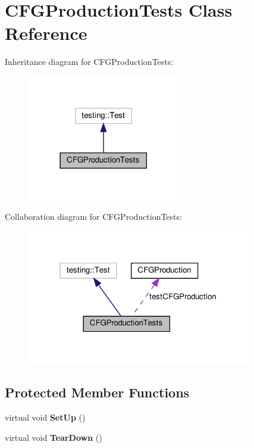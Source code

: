 \hypertarget{classCFGProductionTests}{}\section{C\+F\+G\+Production\+Tests Class Reference}
\label{classCFGProductionTests}


Inheritance diagram for C\+F\+G\+Production\+Tests\+:
\nopagebreak
\begin{figure}[H]
\begin{center}
\leavevmode
\includegraphics[width=189pt]{classCFGProductionTests__inherit__graph}
\end{center}
\end{figure}


Collaboration diagram for C\+F\+G\+Production\+Tests\+:
\nopagebreak
\begin{figure}[H]
\begin{center}
\leavevmode
\includegraphics[width=278pt]{classCFGProductionTests__coll__graph}
\end{center}
\end{figure}
\subsection*{Protected Member Functions}
\begin{DoxyCompactItemize}
\item 
\mbox{\label{classCFGProductionTests_ad140e7c490a16c0cb2cbf0a8f32a3c56}} 
virtual void {\bfseries Set\+Up} ()
\item 
\mbox{\label{classCFGProductionTests_a5767daac7f43c05af1ff20f8c61b953c}} 
virtual void {\bfseries Tear\+Down} ()
\end{DoxyCompactItemize}
